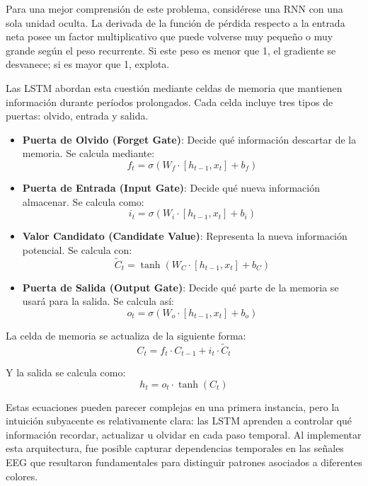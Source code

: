 Para una mejor comprensión de este problema, considérese una RNN con una sola unidad oculta. La derivada de la función de pérdida respecto a la entrada neta posee un factor multiplicativo que puede volverse muy pequeño o muy grande según el peso recurrente. Si este peso es menor que 1, el gradiente se desvanece; si es mayor que 1, explota.

Las LSTM abordan esta cuestión mediante celdas de memoria que mantienen información durante períodos prolongados. Cada celda incluye tres tipos de puertas: olvido, entrada y salida.

\begin{itemize}
    \item \textbf{Puerta de Olvido (Forget Gate)}: Decide qué información descartar de la memoria. Se calcula mediante:
    \begin{equation}
        f_t = \sigma(W_f \cdot [h_{t-1}, x_t] + b_f)
    \end{equation}
    \item \textbf{Puerta de Entrada (Input Gate)}: Decide qué nueva información almacenar. Se calcula como:
    \begin{equation}
        i_t = \sigma(W_i \cdot [h_{t-1}, x_t] + b_i)
    \end{equation}
    \item \textbf{Valor Candidato (Candidate Value)}: Representa la nueva información potencial. Se calcula con:
    \begin{equation}
        \tilde{C}_t = \tanh(W_C \cdot [h_{t-1}, x_t] + b_C)
    \end{equation}
    \item \textbf{Puerta de Salida (Output Gate)}: Decide qué parte de la memoria se usará para la salida. Se calcula así:
    \begin{equation}
        o_t = \sigma(W_o \cdot [h_{t-1}, x_t] + b_o)
    \end{equation}
\end{itemize}

La celda de memoria se actualiza de la siguiente forma:
\begin{equation}
    C_t = f_t \cdot C_{t-1} + i_t \cdot \tilde{C}_t
\end{equation}

Y la salida se calcula como:
\begin{equation}
    h_t = o_t \cdot \tanh(C_t)
\end{equation}

Estas ecuaciones pueden parecer complejas en una primera instancia, pero la intuición subyacente es relativamente clara: las LSTM aprenden a controlar qué información recordar, actualizar u olvidar en cada paso temporal. Al implementar esta arquitectura, fue posible capturar dependencias temporales en las señales EEG que resultaron fundamentales para distinguir patrones asociados a diferentes colores.

